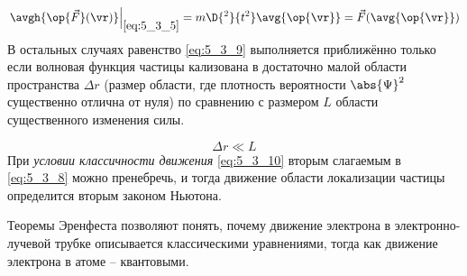 \begin{equation}
\label{eq:5_3_9}
  \left. \avgh{\op{\vec{F}}(\vr)} \right|_{
    \eqref{eq:5_3_5}
  } = m \D{^2}{t^2} \avg{\op{\vr}} = \vec{F}(\avg{\op{\vr}})
\end{equation}%
%
В остальных случаях равенство \eqref{eq:5_3_9} выполняется приближённо только если волновая функция частицы кализована в достаточно малой области пространства $\Delta r$ (размер области, где плотность вероятности $\abs{\Psi}^2$ существенно отлична от нуля) по сравнению с размером $L$ области существенного изменения силы.

\begin{equation}
\label{eq:5_3_10}
\Delta r \ll L
\end{equation}%
%
При {\em условии классичности движения} \eqref{eq:5_3_10} вторым слагаемым в \eqref{eq:5_3_8} можно пренебречь, и тогда движение области локализации частицы определится вторым законом Ньютона.

Теоремы Эренфеста позволяют понять, почему движение электрона в электронно-лучевой трубке описывается классическими уравнениями, тогда как движение электрона в атоме -- квантовыми.